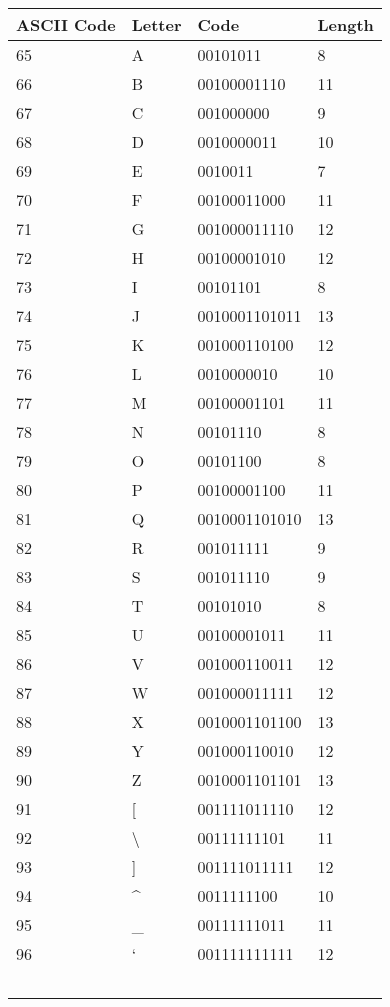 \documentclass[]{article}
\begin{document}
\begin{center}
	\begin{tabular}{ | l | l | l | l |} \hline
		﻿\textbf{ASCII Code} & ﻿\textbf{Letter} & ﻿\textbf{Code} & ﻿\textbf{Length} \\ \hline
	65 & A & 00101011 & 8 \\ \hline
	66 & B & 00100001110 & 11 \\ \hline
	67 & C & 001000000 & 9 \\ \hline
	68 & D & 0010000011 & 10 \\ \hline
	69 & E & 0010011 & 7 \\ \hline
	70 & F & 00100011000 & 11 \\ \hline
	71 & G & 001000011110 & 12 \\ \hline
	72 & H & 00100001010 & 12 \\ \hline
	73 & I & 00101101 & 8 \\ \hline
	74 & J & 0010001101011 & 13 \\ \hline
	75 & K & 001000110100 & 12 \\ \hline
	76 & L & 0010000010 & 10 \\ \hline
	77 & M & 00100001101 & 11 \\ \hline
	78 & N & 00101110 & 8 \\ \hline
	79 & O & 00101100 & 8 \\ \hline
	80 & P & 00100001100 & 11 \\ \hline
	81 & Q & 0010001101010 & 13 \\ \hline
	82 & R & 001011111 & 9 \\ \hline
	83 & S & 001011110 & 9 \\ \hline
	84 & T & 00101010 & 8 \\ \hline
	85 & U & 00100001011 & 11 \\ \hline
	86 & V & 001000110011 & 12 \\ \hline
	87 & W & 001000011111 & 12 \\ \hline
	88 & X & 0010001101100 & 13 \\ \hline
	89 & Y & 001000110010 & 12 \\ \hline
	90 & Z & 0010001101101 & 13 \\ \hline
	91 & [ & 001111011110 & 12 \\ \hline
	92 & \textbackslash & 00111111101 & 11 \\ \hline
	93 & ] & 001111011111 & 12 \\ \hline
	94 & \^{} & 0011111100 & 10 \\ \hline
	95 & \_ & 00111111011 & 11 \\ \hline
	96 & ` & 001111111111 & 12 \\ \hline
	﻿\end{tabular}
\end{center}
\end{document}
